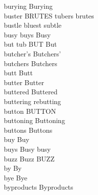 burying Burying\\
buster BRUTES tubers brutes\\
bustle bluest subtle\\
busy buys Busy\\
but tub BUT But\\
butcher's Butchers'\\
butchers Butchers\\
butt Butt\\
butter Butter\\
buttered Buttered\\
buttering rebutting\\
button BUTTON\\
buttoning Buttoning\\
buttons Buttons\\
buy Buy\\
buys Busy busy\\
buzz Buzz BUZZ\\
by By\\
bye Bye\\
byproducts Byproducts\\

